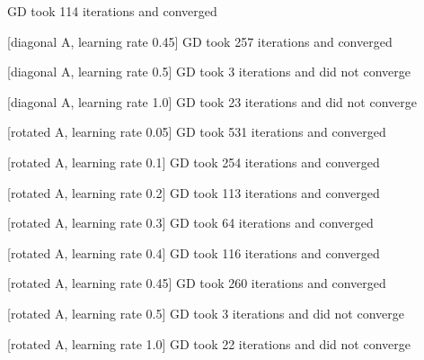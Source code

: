 \begin{answer}
 GD took 114 iterations and converged

[diagonal A, learning rate 0.45] GD took 257 iterations and converged

[diagonal A, learning rate 0.5] GD took 3 iterations and did not converge

[diagonal A, learning rate 1.0] GD took 23 iterations and did not converge

[rotated A, learning rate 0.05] GD took 531 iterations and converged

[rotated A, learning rate 0.1] GD took 254 iterations and converged

[rotated A, learning rate 0.2] GD took 113 iterations and converged

[rotated A, learning rate 0.3] GD took 64 iterations and converged

[rotated A, learning rate 0.4] GD took 116 iterations and converged

[rotated A, learning rate 0.45] GD took 260 iterations and converged

[rotated A, learning rate 0.5] GD took 3 iterations and did not converge

[rotated A, learning rate 1.0] GD took 22 iterations and did not converge

\end{answer}